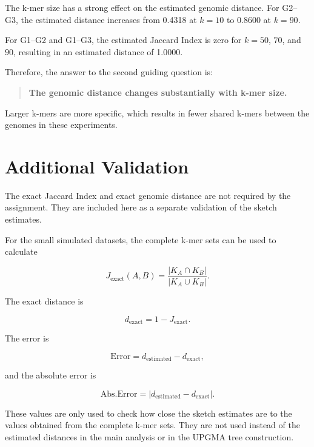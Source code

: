 \documentclass[11pt,a4paper]{article}
\begin{document}
The k-mer size has a strong effect on the estimated genomic distance.
For G2--G3, the estimated distance increases from 0.4318 at $k=10$ to
0.8600 at $k=90$.

For G1--G2 and G1--G3, the estimated Jaccard Index is zero for
$k=50$, $70$, and $90$, resulting in an estimated distance of 1.0000.

Therefore, the answer to the second guiding question is:

\begin{quote}
\textbf{The genomic distance changes substantially with k-mer size.}
\end{quote}

Larger k-mers are more specific, which results in fewer shared k-mers
between the genomes in these experiments.

\section{Additional Validation}

The exact Jaccard Index and exact genomic distance are not required by the
assignment. They are included here as a separate validation of the sketch
estimates.

For the small simulated datasets, the complete k-mer sets can be used to
calculate

\begin{equation}
J_{\mathrm{exact}}(A,B)
=
\frac{|K_A\cap K_B|}
{|K_A\cup K_B|}.
\end{equation}

The exact distance is

\begin{equation}
d_{\mathrm{exact}}
=
1-J_{\mathrm{exact}}.
\end{equation}

The error is

\begin{equation}
\mathrm{Error}
=
d_{\mathrm{estimated}}-d_{\mathrm{exact}},
\end{equation}

and the absolute error is

\begin{equation}
\mathrm{Abs.Error}
=
|d_{\mathrm{estimated}}-d_{\mathrm{exact}}|.
\end{equation}

These values are only used to check how close the sketch estimates are to the
values obtained from the complete k-mer sets. They are not used instead of the
estimated distances in the main analysis or in the UPGMA tree construction.
\end{document}
